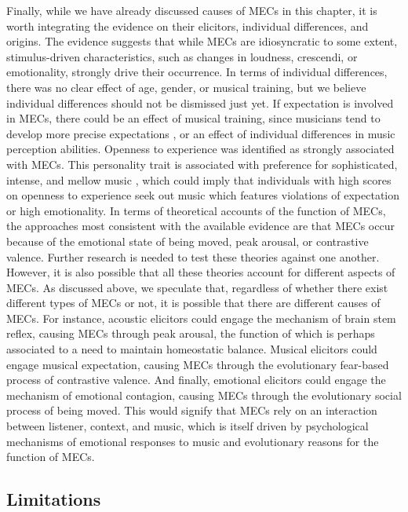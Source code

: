 Finally, while we have already discussed causes of MECs in this chapter, it is worth integrating the evidence on their elicitors, individual differences, and origins. The evidence suggests that while MECs are idiosyncratic to some extent, stimulus-driven characteristics, such as changes in loudness, crescendi, or emotionality, strongly drive their occurrence. In terms of individual differences, there was no clear effect of age, gender, or musical training, but we believe individual differences should not be dismissed just yet. If expectation is involved in MECs, there could be an effect of musical training, since musicians tend to develop more precise expectations \parencite{hansen2014, hansen2016, quirogamartinez2019}, or an effect of individual differences in music perception abilities. Openness to experience was identified as strongly associated with MECs. This personality trait is associated with preference for sophisticated, intense, and mellow music \parencite{schafer2017}, which could imply that individuals with high scores on openness to experience seek out music which features violations of expectation or high emotionality. In terms of theoretical accounts of the function of MECs, the approaches most consistent with the available evidence are that MECs occur because of the emotional state of being moved, peak arousal, or contrastive valence. Further research is needed to test these theories against one another. However, it is also possible that all these theories account for different aspects of MECs. As discussed above, we speculate that, regardless of whether there exist different types of MECs or not, it is possible that there are different causes of MECs. For instance, acoustic elicitors could engage the mechanism of brain stem reflex, causing MECs through peak arousal, the function of which is perhaps associated to a need to maintain homeostatic balance. Musical elicitors could engage musical expectation, causing MECs through the evolutionary fear-based process of contrastive valence. And finally, emotional elicitors could engage the mechanism of emotional contagion, causing MECs through the evolutionary social process of being moved. This would signify that MECs rely on an interaction between listener, context, and music, which is itself driven by psychological mechanisms of emotional responses to music and evolutionary reasons for the function of MECs.

\subsection{Limitations}

